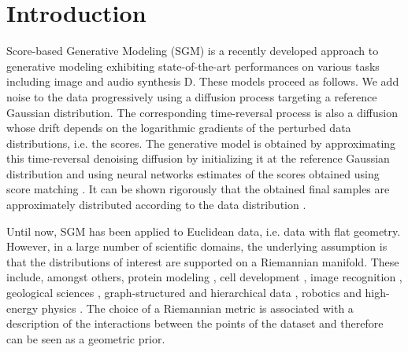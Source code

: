 \section{Introduction}
\label{sec:introduction}

Score-based Generative Modeling (SGM) is a recently developed approach to
generative modeling exhibiting state-of-the-art performances on various tasks
including image and audio synthesis
D\citep{song2019generative,song2020score,ho2020denoising,nichol2021improved,nichol2021beatgans}. These
models proceed as follows. We add noise to the data progressively using a
diffusion process targeting a reference Gaussian distribution. The corresponding
time-reversal process is also a diffusion whose drift depends on the logarithmic
gradients of the perturbed data distributions, i.e. the scores. The generative
model is obtained by approximating this time-reversal denoising diffusion by
initializing it at the reference Gaussian distribution and using neural networks
estimates of the scores obtained using score matching
\cite{hyvarinen2005estimation,vincent2011connection}. It can be shown rigorously
that the obtained final samples are approximately distributed according to the
data distribution \citep{debortoli2021neurips}.

Until now, SGM has been applied to Euclidean data, i.e. data with flat
geometry. However, in a large number of scientific domains, the underlying
assumption is that the distributions of interest are supported on a Riemannian
manifold. These include, amongst others, protein modeling
\citep{boomsma2008generative,hamelryck2006sampling,mardia2008multivariate,shapovalov2011smoothed,mardia2007protein},
cell development \citep{klimovskaia2020poincare}, image recognition
\citep{lui2012advances}, geological sciences
\citep{karpatne2018machine,peel2001fitting}, graph-structured and hierarchical
data \citep{roy2007learning,steyvers2005large}, robotics
\citep{feiten2013rigid,senanayake2018directional} and high-energy physics
\citep{brehmer2020flows}. The choice of a Riemannian metric is associated with a
description of the interactions between the points of the dataset and therefore
can be seen as a geometric prior.


